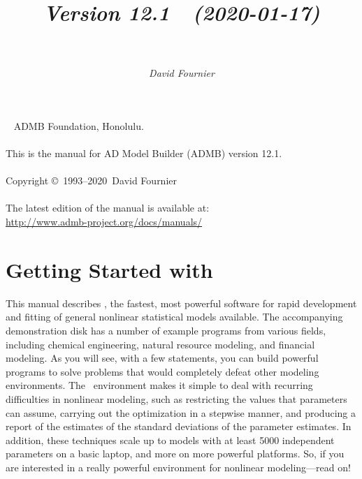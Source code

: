 \documentclass{admbmanual}
\newcommand\admbversion{12.1}
\newcommand\admbyear{2020}
\newcommand\admbdate{2020-01-17}
\begin{document}
\title{%
  \vspace{3ex}\textsf{\textit{Version \admbversion~~(\admbdate)\\[3pt]
      ~%
    }}\vspace{3ex}
}
\author{\textsf{\textit{David Fournier}}}
\maketitle

~\vfill
\noindent ADMB Foundation, Honolulu.\\\\
\noindent This is the manual for AD Model Builder (ADMB) version
\admbversion.\\\\
\noindent Copyright \copyright\ 1993--\admbyear\ David Fournier\\\\
\noindent The latest edition of the manual is available at:\\
\url{http://www.admb-project.org/docs/manuals/}

\tableofcontents

\chapter{Getting Started with \ADM}

This manual describes \ADM, the fastest, most powerful software for rapid
development and fitting of general nonlinear statistical models available. The
accompanying demonstration disk has a number of example programs from various
fields, including chemical engineering, natural resource modeling, and financial
modeling. As you will see, with a few statements, you can build powerful
programs to solve problems that would completely defeat other modeling
environments. The \ADM\ environment makes it simple to deal with recurring
difficulties in nonlinear modeling, such as restricting the values that
parameters can assume, carrying out the optimization in a stepwise manner, and
producing a report of the estimates of the standard deviations of the parameter
estimates. In addition, these techniques scale up to models with at least 5000
independent parameters on a basic laptop, and more on more powerful
platforms. So, if you are interested in a really powerful environment for
nonlinear modeling---read on!
\end{document}

